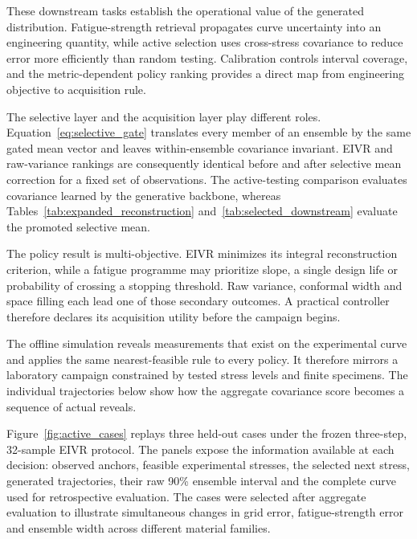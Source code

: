 \documentclass[a4paper,fleqn]{cas-dc}
\begin{document}
These downstream tasks establish the operational value of the generated distribution. Fatigue-strength retrieval propagates curve uncertainty into an engineering quantity, while active selection uses cross-stress covariance to reduce error more efficiently than random testing. Calibration controls interval coverage, and the metric-dependent policy ranking provides a direct map from engineering objective to acquisition rule.

The selective layer and the acquisition layer play different roles. Equation~\eqref{eq:selective_gate} translates every member of an ensemble by the same gated mean vector and leaves within-ensemble covariance invariant. EIVR and raw-variance rankings are consequently identical before and after selective mean correction for a fixed set of observations. The active-testing comparison evaluates covariance learned by the generative backbone, whereas Tables~\ref{tab:expanded_reconstruction} and~\ref{tab:selected_downstream} evaluate the promoted selective mean.

The policy result is multi-objective. EIVR minimizes its integral reconstruction criterion, while a fatigue programme may prioritize slope, a single design life or probability of crossing a stopping threshold. Raw variance, conformal width and space filling each lead one of those secondary outcomes. A practical controller therefore declares its acquisition utility before the campaign begins.

The offline simulation reveals measurements that exist on the experimental curve and applies the same nearest-feasible rule to every policy. It therefore mirrors a laboratory campaign constrained by tested stress levels and finite specimens. The individual trajectories below show how the aggregate covariance score becomes a sequence of actual reveals.

Figure~\ref{fig:active_cases} replays three held-out cases under the frozen three-step, 32-sample EIVR protocol. The panels expose the information available at each decision: observed anchors, feasible experimental stresses, the selected next stress, generated trajectories, their raw 90\% ensemble interval and the complete curve used for retrospective evaluation. The cases were selected after aggregate evaluation to illustrate simultaneous changes in grid error, fatigue-strength error and ensemble width across different material families.
\end{document}
